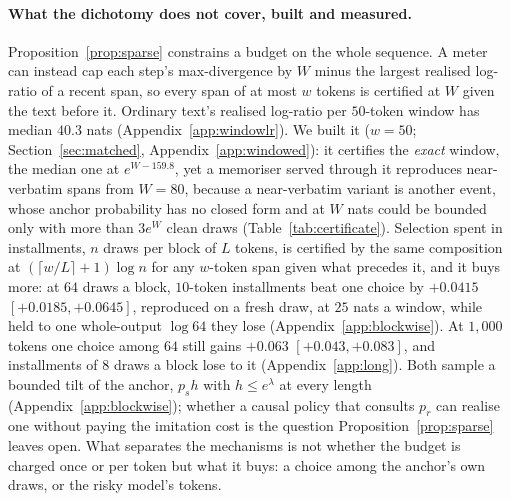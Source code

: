 \paragraph{What the dichotomy does not cover, built and measured.}\label{sec:uncovered} Proposition~\ref{prop:sparse}
constrains a budget on the whole sequence. A meter can instead cap each step's max-divergence by $W$ minus
the largest realised log-ratio of a recent span, so every span of at most $w$ tokens is certified at $W$
given the text before it. Ordinary text's realised log-ratio per $50$-token window has median
$40.3$ nats (Appendix~\ref{app:windowlr}). We built it ($w=50$; Section~\ref{sec:matched},
Appendix~\ref{app:windowed}):
it certifies the \emph{exact} window, the median one at $e^{W-159.8}$, yet a memoriser served through it
reproduces near-verbatim spans from $W=80$, because a near-verbatim variant is another event, whose anchor
probability has no closed form and at $W$ nats could be bounded only with more than $3e^{W}$ clean draws
(Table~\ref{tab:certificate}). Selection spent in installments, $n$ draws per block of $L$ tokens, is
certified by the same composition at $(\lceil w/L\rceil + 1)\log n$ for any $w$-token span given what
precedes it, and it buys more: at $64$ draws a block, $10$-token installments beat one choice by $+0.0415$
$[+0.0185, +0.0645]$, reproduced on a fresh draw, at $25$ nats a window, while held
to one whole-output $\log 64$ they lose (Appendix~\ref{app:blockwise}). At $1{,}000$ tokens one choice among $64$
still gains $+0.063$ $[+0.043, +0.083]$, and installments of $8$ draws a block lose to it (Appendix~\ref{app:long}). Both sample a bounded tilt of the
anchor, $p_s h$ with $h \le e^{\lambda}$ at every length (Appendix~\ref{app:blockwise}); whether a causal
policy that consults $p_r$ can realise one without paying the imitation cost is the question
Proposition~\ref{prop:sparse} leaves open. What separates the mechanisms is not whether the budget is charged once or per token but what
it buys: a choice among the anchor's own draws, or the risky model's tokens.
